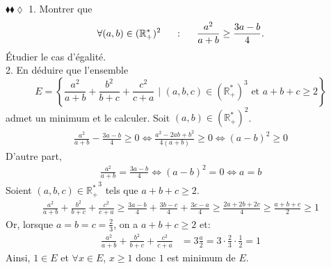 \documentclass[11pt]{article}
\begin{document}
\begin{exercice}{$\blacklozenge\blacklozenge\lozenge$}{}
    1. Montrer que
    \begin{equation*}
        \forall(a,b)\in(\mathbb{R}^*_+)^2\hspace{0.5cm}:\hspace{0.5cm}\frac{a^2}{a+b}\geq\frac{3a-b}{4}.
    \end{equation*}
    Étudier le cas d'égalité.\\
    2. En déduire que l'ensemble
    \begin{equation*}
        E=\left\{\frac{a^2}{a+b}+\frac{b^2}{b+c}+\frac{c^2}{c+a} \text{ | } (a,b,c)\in(\mathbb{R^*_+})^3 \text{ et } a+b+c\geq2 \right\}
    \end{equation*}
    admet un minimum et le calculer.
    \tcblower
     Soit $(a,b)\in(\mathbb{R}^*_+)^2$.
    \begin{align*}
        \frac{a^2}{a+b}-\frac{3a-b}{4}\geq0\iff\frac{a^2-2ab+b^2}{4(a+b)}\geq0\iff(a-b)^2\geq0
    \end{align*}
    D'autre part,
    \begin{align*}
        \frac{a^2}{a+b}=\frac{3a-b}{4}
        \iff (a-b)^2=0
        \iff a=b
    \end{align*}
     Soient $(a,b,c)\in\mathbb{R^*_+}^3$ tels que $a+b+c\geq2$.
    \begin{align*}
        \frac{a^2}{a+b}+\frac{b^2}{b+c}+\frac{c^2}{c+a}
        \geq\frac{3a-b}{4}+\frac{3b-c}{4}+\frac{3c-a}{4}
        \geq\frac{2a+2b+2c}{4}
        \geq\frac{a+b+c}{2}
        \geq1
    \end{align*}
    Or, lorsque $a=b=c=\frac{2}{3}$, on a $a+b+c\geq2$ et:
    \begin{align*}
        \frac{a^2}{a+b}+\frac{b^2}{b+c}+\frac{c^2}{c+a}
        &=3\frac{a}{2}=3\cdot\frac{2}{3}\cdot\frac{1}{2}=1
    \end{align*}
    Ainsi, $1\in E$ et $\forall{x\in E}$, $x\geq1$ donc $1$ est minimum de $E$.
\end{exercice}
\end{document}
